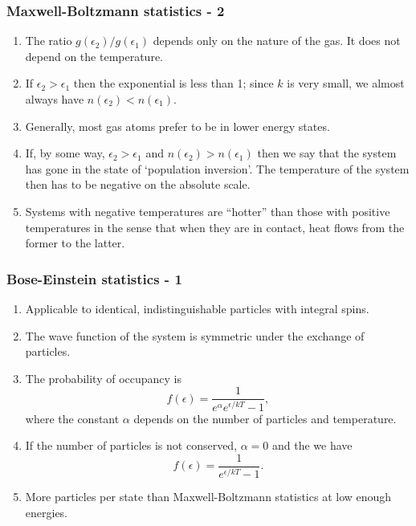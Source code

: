 \documentclass{beamer}
\begin{document}
\begin{frame}
\frametitle{Maxwell-Boltzmann statistics - 2}
\begin{enumerate}
\item The ratio $g(\epsilon_2)/g(\epsilon_1)$ depends only on the nature of the
gas. It does not depend on the temperature.
\item If $\epsilon_2 > \epsilon_1$ then the exponential is less than 1; since 
$k$ is very small, we almost always have $n(\epsilon_2) < n(\epsilon_1)$.
\item Generally, most gas atoms prefer to be in lower energy states.
\item If, by some way, $\epsilon_2>\epsilon_1$ and $n(\epsilon_2)>n(\epsilon_1)$
then we say that the system has gone in the state of `population inversion'. The
temperature of the system then has to be negative on the absolute scale.
\item Systems with negative temperatures are ``hotter'' than those with positive
temperatures in the sense that when they are in contact, heat flows from the
former to the latter.
\end{enumerate}
\end{frame}

\begin{frame}
\frametitle{Bose-Einstein statistics - 1}
\begin{enumerate}
\item Applicable to identical, indistinguishable particles with integral spins.
\item The wave function of the system is symmetric under the exchange of 
particles.
\item The probability of occupancy is
\begin{equation}\label{e6}
f(\epsilon) = \frac{1}{e^\alpha e^{\epsilon/kT} - 1},
\end{equation}
where the constant $\alpha$ depends on the number of particles and temperature.
\item If the number of particles is not conserved, $\alpha = 0$ and the we have
\begin{equation}\label{e7}
f(\epsilon) = \frac{1}{e^{\epsilon/kT} - 1}.
\end{equation}
\item More particles per state than Maxwell-Boltzmann statistics at low enough
energies.
\end{enumerate}
\end{frame}
\end{document}
